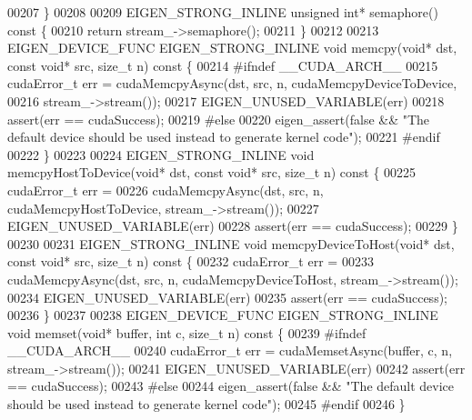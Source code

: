 \begin{DoxyCode}
00207   \}
00208 
00209   EIGEN\_STRONG\_INLINE \textcolor{keywordtype}{unsigned} \textcolor{keywordtype}{int}* semaphore()\textcolor{keyword}{ const }\{
00210     \textcolor{keywordflow}{return} stream\_->semaphore();
00211   \}
00212 
00213   EIGEN\_DEVICE\_FUNC EIGEN\_STRONG\_INLINE \textcolor{keywordtype}{void} memcpy(\textcolor{keywordtype}{void}* dst, \textcolor{keyword}{const} \textcolor{keywordtype}{void}* src, \textcolor{keywordtype}{size\_t} n)\textcolor{keyword}{ const }\{
00214 \textcolor{preprocessor}{#ifndef \_\_CUDA\_ARCH\_\_}
00215     cudaError\_t err = cudaMemcpyAsync(dst, src, n, cudaMemcpyDeviceToDevice,
00216                                       stream\_->stream());
00217     EIGEN\_UNUSED\_VARIABLE(err)
00218     assert(err == cudaSuccess);
00219 \textcolor{preprocessor}{#else}
00220   eigen\_assert(\textcolor{keyword}{false} && \textcolor{stringliteral}{"The default device should be used instead to generate kernel code"});
00221 \textcolor{preprocessor}{#endif}
00222   \}
00223 
00224   EIGEN\_STRONG\_INLINE \textcolor{keywordtype}{void} memcpyHostToDevice(\textcolor{keywordtype}{void}* dst, \textcolor{keyword}{const} \textcolor{keywordtype}{void}* src, \textcolor{keywordtype}{size\_t} n)\textcolor{keyword}{ const }\{
00225     cudaError\_t err =
00226         cudaMemcpyAsync(dst, src, n, cudaMemcpyHostToDevice, stream\_->stream());
00227     EIGEN\_UNUSED\_VARIABLE(err)
00228     assert(err == cudaSuccess);
00229   \}
00230 
00231   EIGEN\_STRONG\_INLINE \textcolor{keywordtype}{void} memcpyDeviceToHost(\textcolor{keywordtype}{void}* dst, \textcolor{keyword}{const} \textcolor{keywordtype}{void}* src, \textcolor{keywordtype}{size\_t} n)\textcolor{keyword}{ const }\{
00232     cudaError\_t err =
00233         cudaMemcpyAsync(dst, src, n, cudaMemcpyDeviceToHost, stream\_->stream());
00234     EIGEN\_UNUSED\_VARIABLE(err)
00235     assert(err == cudaSuccess);
00236   \}
00237 
00238   EIGEN\_DEVICE\_FUNC EIGEN\_STRONG\_INLINE \textcolor{keywordtype}{void} memset(\textcolor{keywordtype}{void}* buffer, \textcolor{keywordtype}{int} c, \textcolor{keywordtype}{size\_t} n)\textcolor{keyword}{ const }\{
00239 \textcolor{preprocessor}{#ifndef \_\_CUDA\_ARCH\_\_}
00240     cudaError\_t err = cudaMemsetAsync(buffer, c, n, stream\_->stream());
00241     EIGEN\_UNUSED\_VARIABLE(err)
00242     assert(err == cudaSuccess);
00243 \textcolor{preprocessor}{#else}
00244   eigen\_assert(\textcolor{keyword}{false} && \textcolor{stringliteral}{"The default device should be used instead to generate kernel code"});
00245 \textcolor{preprocessor}{#endif}
00246   \}

\end{DoxyCode}
